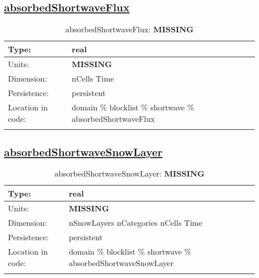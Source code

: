\subsection[absorbedShortwaveFlux]{\hyperref[sec:var_tab_shortwave]{absorbedShortwaveFlux}}
\label{subsec:var_sec_shortwave_absorbedShortwaveFlux}
\begin{center}
\begin{longtable}{| p{2.0in} | p{4.0in} |}
        \hline 
        Type: & real \\
        \hline 
        Units: & {\bf \color{red} MISSING} \\
        \hline 
        Dimension: & nCells Time \\
        \hline 
        Persistence: & persistent \\
        \hline 
         Location in code: & domain \% blocklist \% shortwave \% absorbedShortwaveFlux \\
         \hline 
    \caption{absorbedShortwaveFlux: {\bf \color{red} MISSING}}
\end{longtable}
\end{center}
\subsection[absorbedShortwaveSnowLayer]{\hyperref[sec:var_tab_shortwave]{absorbedShortwaveSnowLayer}}
\label{subsec:var_sec_shortwave_absorbedShortwaveSnowLayer}
\begin{center}
\begin{longtable}{| p{2.0in} | p{4.0in} |}
        \hline 
        Type: & real \\
        \hline 
        Units: & {\bf \color{red} MISSING} \\
        \hline 
        Dimension: & nSnowLayers nCategories nCells Time \\
        \hline 
        Persistence: & persistent \\
        \hline 
         Location in code: & domain \% blocklist \% shortwave \% absorbedShortwaveSnowLayer \\
         \hline 
    \caption{absorbedShortwaveSnowLayer: {\bf \color{red} MISSING}}
\end{longtable}
\end{center}
